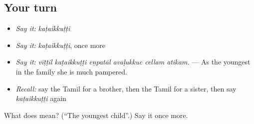 \subsection*{Your turn}
\begin{itemize}
\raggedright
  \item \emph{Say it:} \emph{kaṭaikkuṭṭi}
  \item \emph{Say it:} \emph{kaṭaikkuṭṭi}, once more
  \item \emph{Say it:} \emph{vīṭṭil kaṭaikkuṭṭi eṉpatāl avaḷukkuc cellam atikam.} — As the youngest in the family she is much pampered.
  \item \emph{Recall:} say the Tamil for a brother, then the Tamil for a sister, then say \emph{kaṭaikkuṭṭi} again
\end{itemize}

\begin{tcolorbox}[breakable,colback=teal!4,colframe=teal!35!black,title={Before you move on}]
What does  mean? (\textquotedblleft{}The youngest child\textquotedblright{}.) Say it once more.
\end{tcolorbox}
